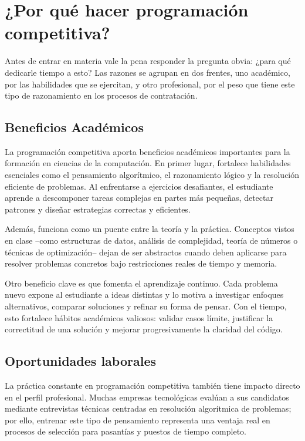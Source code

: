 \section{¿Por qué hacer programación competitiva?}

Antes de entrar en materia vale la pena responder la pregunta obvia: ¿para qué dedicarle tiempo a esto? Las razones se agrupan en dos frentes, uno académico, por las habilidades que se ejercitan, y otro profesional, por el peso que tiene este tipo de razonamiento en los procesos de contratación.

\subsection{Beneficios Académicos}
La programación competitiva aporta beneficios académicos importantes para la formación en ciencias de la computación. En primer lugar, fortalece habilidades esenciales como el pensamiento algorítmico, el razonamiento lógico y la resolución eficiente de problemas. Al enfrentarse a ejercicios desafiantes, el estudiante aprende a descomponer tareas complejas en partes más pequeñas, detectar patrones y diseñar estrategias correctas y eficientes.

Además, funciona como un puente entre la teoría y la práctica. Conceptos vistos en clase --como estructuras de datos, análisis de complejidad, teoría de números o técnicas de optimización-- dejan de ser abstractos cuando deben aplicarse para resolver problemas concretos bajo restricciones reales de tiempo y memoria.

Otro beneficio clave es que fomenta el aprendizaje continuo. Cada problema nuevo expone al estudiante a ideas distintas y lo motiva a investigar enfoques alternativos, comparar soluciones y refinar su forma de pensar. Con el tiempo, esto fortalece hábitos académicos valiosos: validar casos límite, justificar la correctitud de una solución y mejorar progresivamente la claridad del código.

\subsection{Oportunidades laborales}
La práctica constante en programación competitiva también tiene impacto directo en el perfil profesional. Muchas empresas tecnológicas evalúan a sus candidatos mediante entrevistas técnicas centradas en resolución algorítmica de problemas; por ello, entrenar este tipo de pensamiento representa una ventaja real en procesos de selección para pasantías y puestos de tiempo completo.


